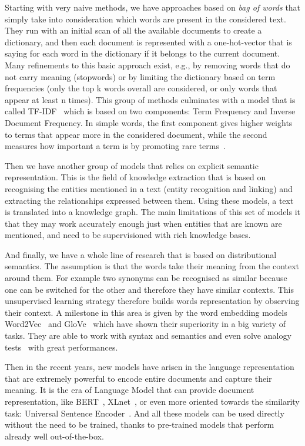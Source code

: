 Starting with very naive methods, we have approaches based on \emph{bag of words} that simply take into consideration which words are present in the considered text.
They run with an initial scan of all the available documents to create a dictionary, and then each document is represented with a one-hot-vector that is saying for each word in the dictionary if it belongs to the current document.
Many refinements to this basic approach exist, e.g., by removing words that do not carry meaning (stopwords) or by limiting the dictionary based on term frequencies (only the top k words overall are considered, or only words that appear at least n times).
This group of methods culminates with a model that is called TF-IDF~\cite{ramos2003using} which is based on two components: Term Frequency and Inverse Document Frequency.
In simple words, the first component gives higher weights to terms that appear more in the considered document, while the second measures how important a term is by promoting rare terms~\cite{jones1972statistical}.

Then we have another group of models that relies on explicit semantic representation. This is the field of knowledge extraction that is based on recognising the entities mentioned in a text (entity recognition and linking) and extracting the relationships expressed between them. Using these models, a text is translated into a knowledge graph.
The main limitations of this set of models it that they may work accurately enough just when entities that are known are mentioned, and need to be supervisioned with rich knowledge bases.

And finally, we have a whole line of research that is based on distributional semantics.
The assumption is that the words take their meaning from the context around them. For example two synonyms can be recognised as similar because one can be switched for the other and therefore they have similar contexts.
This unsupervised learning strategy therefore builds words representation by observing their context.
A milestone in this area is given by the word embedding models Word2Vec~\cite{TODO} and GloVe~\cite{TODO} which have shown their superiority in a big variety of tasks.
They are able to work with syntax and semantics and even solve analogy tests~\cite{mikolov2013efficient} with great performances.

Then in the recent years, new models have arisen in the language representation that are extremely powerful to encode entire documents and capture their meaning. It is the
era of
Language Model that can provide document representation, like BERT~\cite{devlin2018bert}, XLnet~\cite{yang2019xlnet}, or even more oriented towards the similarity task: Universal Sentence Encoder~\cite{cer2018universal}.
And all these models can be used directly without the need to be trained, thanks to pre-trained models that perform already well out-of-the-box.

